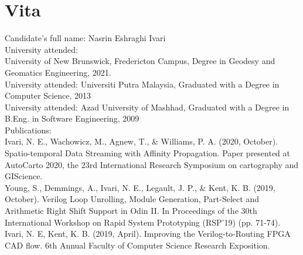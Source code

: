 \clearpage
{}  %
\chapter*{Vita}
\pagestyle{empty}
\thispagestyle{empty}
\singlespacing
Candidate's full name: Nasrin Eshraghi Ivari\\


University attended: \\

University of New Brunswick, Fredericton Campus, Degree in Geodesy and Geomatics Engineering, 2021.\\

University attended: Universiti Putra Malaysia, Graduated with a Degree in Computer Science, 2013\\

University attended: Azad University of Mashhad, Graduated with a Degree in B.Eng. in Software Engineering, 2009\\


Publications:\\

Ivari, N. E., Wachowicz, M., Agnew, T., \& Williams, P. A. (2020, October). Spatio-temporal Data Streaming with Affinity Propagation. Paper presented at AutoCarto 2020, the 23rd International Research Symposium on cartography and GIScience.\\


Young, S., Demmings, A., Ivari, N. E., Legault, J. P., \& Kent, K. B. (2019, October). Verilog Loop Unrolling, Module Generation, Part-Select and Arithmetic Right Shift Support in Odin II. In Proceedings of the 30th International Workshop on Rapid System Prototyping (RSP'19) (pp. 71-74).\\


Ivari, N. E, Kent, K. B. (2019, April). Improving the Verilog-to-Routing FPGA CAD flow. 6th Annual Faculty of Computer Science Research Exposition.\\


